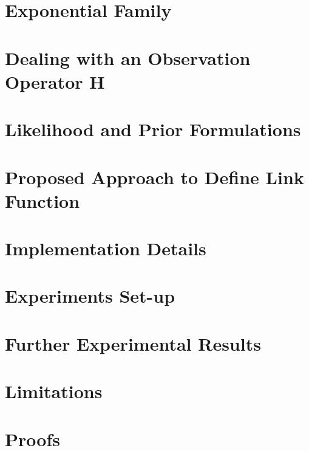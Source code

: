 \renewcommand{\thefigure}{A\arabic{figure}}  %
\renewcommand{\thetable}{A\arabic{table}}    %

\newpage
\clearpage
\section{Exponential Family}
\label{app-exponential-family}


\clearpage
\newpage
\section{Dealing with an Observation Operator $\mathbf{H}$}
\label{app-observation-operator-H}


\clearpage
\newpage
\section{Likelihood and Prior Formulations} \label{app-table_distributions}


\clearpage
\newpage


\clearpage
\newpage
\section{Proposed Approach to Define Link Function}\label{app-proposed_link_distributions}


\clearpage
\newpage
\section{Implementation Details}
\label{app-implementation}


\clearpage
\newpage
\section{Experiments Set-up}
\label{app-experiment-set-up}


\clearpage
\newpage
\section{Further Experimental Results}
\label{app-further-experimental-results}


\clearpage
\newpage
\section{Limitations}
\label{app-limitations}



\newpage
\section{Proofs}
\label{app-proofs}



